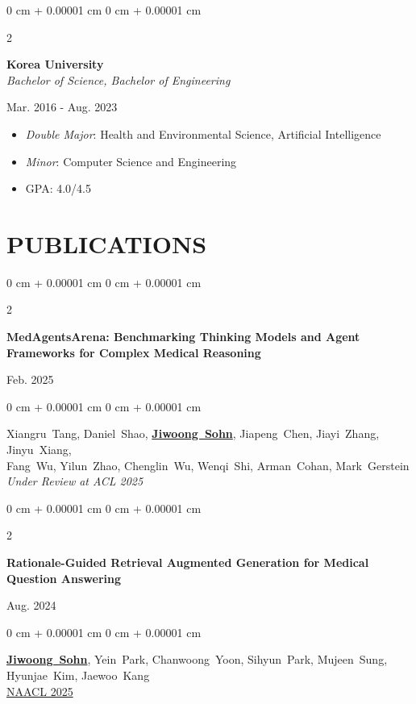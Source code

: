 \documentclass[10pt, letterpaper]{article}
\newenvironment{highlights}{
    \begin{itemize}[
        topsep=0.10 cm,
        parsep=0.10 cm,
        partopsep=0pt,
        itemsep=0pt,
        leftmargin=0 cm + 10pt
    ]
}{
    \end{itemize}
} %
\newenvironment{onecolentry}{
    \begin{adjustwidth}{
        0 cm + 0.00001 cm
    }{
        0 cm + 0.00001 cm
    }
}{
    \end{adjustwidth}
} %
\newenvironment{twocolentry}[2][]{
    \onecolentry
    \def\secondColumn{#2}
    \setcolumnwidth{\fill, 3.5 cm}
    \begin{paracol}{2}
}{
    \switchcolumn \raggedleft \secondColumn
    \end{paracol}
    \endonecolentry
} %
\begin{document}
        \begin{twocolentry}{
            Mar. 2016 - Aug. 2023
        }
            \textbf{Korea University}\\\textit{Bachelor of Science, Bachelor of Engineering}
        \end{twocolentry}

        \begin{highlights}
            
            \item \textit{Double Major}: Health and Environmental Science, Artificial Intelligence
             \\
            \item \textit{Minor}: Computer Science and Engineering
            \item GPA: 4.0/4.5
             \\
        \end{highlights}
    \vspace{0.05 cm}

\section{PUBLICATIONS}
\vspace{0.1 cm}
       \begin{twocolentry}
            {
                Feb. 2025
            }
            {
                \textbf{MedAgentsArena: Benchmarking Thinking Models and Agent Frameworks for Complex Medical Reasoning}
            }
        \end{twocolentry}           
        \begin{onecolentry}
                \mbox{Xiangru Tang}, \mbox{Daniel Shao}, \mbox{\textbf{\underline{Jiwoong Sohn}}}, \mbox{Jiapeng Chen}, \mbox{Jiayi Zhang}, \mbox{Jinyu Xiang}, \\
                \mbox{Fang Wu}, \mbox{Yilun Zhao}, \mbox{Chenglin Wu}, \mbox{Wenqi Shi}, \mbox{Arman Cohan}, \mbox{Mark Gerstein} \\
                \textit{Under Review at ACL 2025}
        \end{onecolentry}
    \vspace{0.2 cm}

       \begin{twocolentry}
            {
                Aug. 2024
            }
            {
                \textbf{Rationale-Guided Retrieval Augmented Generation for Medical Question Answering}
            }         
        \end{twocolentry}            
        \begin{onecolentry}
                \mbox{\textbf{\underline{Jiwoong Sohn}}}, \mbox{Yein Park},
                \mbox{Chanwoong Yoon}, \mbox{Sihyun Park},
                \mbox{Mujeen Sung}, \mbox{Hyunjae Kim}, \mbox{Jaewoo Kang} \\
        \href{https://arxiv.org/abs/2411.00300} {{NAACL 2025}}   
        \end{onecolentry}
    \vspace{0.2 cm}
\end{document}
